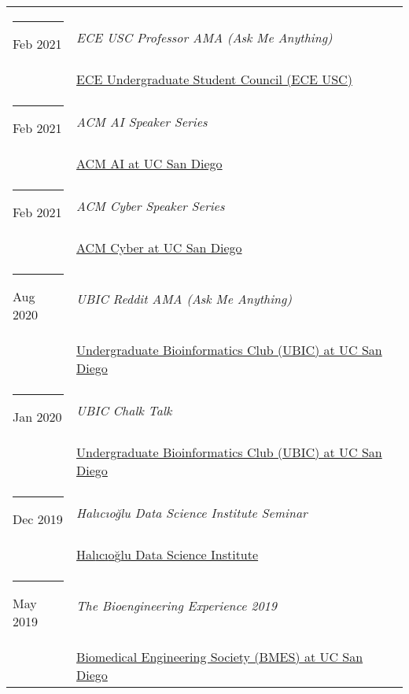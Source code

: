 \documentclass[margin,line]{res}
\begin{document}
\begin{resume}
\begin{longtable}{@{}p{0.7in}p{4in}}
\hspace*{-4mm} \rule{-1mm}{5mm} Feb 2021 & \textit{ECE USC Professor AMA (Ask Me Anything)}\\*
\hspace*{-4mm} & \hspace{4mm} \href{https://eceusc.ucsd.edu/}{ECE Undergraduate Student Council (ECE USC)}\\
\hspace*{-4mm} \rule{-1mm}{5mm} Feb 2021 & \textit{ACM AI Speaker Series}\\*
\hspace*{-4mm} & \hspace{4mm} \href{https://ai.acmucsd.com/}{ACM AI at UC San Diego}\\
\hspace*{-4mm} \rule{-1mm}{5mm} Feb 2021 & \textit{ACM Cyber Speaker Series}\\*
\hspace*{-4mm} & \hspace{4mm} \href{https://www.facebook.com/cyberucsd}{ACM Cyber at UC San Diego}\\
\hspace*{-4mm} \rule{-1mm}{5mm} Aug 2020 & \textit{UBIC Reddit AMA (Ask Me Anything)}\\*
\hspace*{-4mm} & \hspace{4mm} \href{http://ubicucsd.github.io/}{Undergraduate Bioinformatics Club (UBIC) at UC San Diego}\\
\hspace*{-4mm} \rule{-1mm}{5mm} Jan 2020 & \textit{UBIC Chalk Talk}\\*
\hspace*{-4mm} & \hspace{4mm} \href{http://ubicucsd.github.io/}{Undergraduate Bioinformatics Club (UBIC) at UC San Diego}\\
\hspace*{-4mm} \rule{-1mm}{5mm} Dec 2019 & \textit{Hal{\i}c{\i}o{\u g}lu Data Science Institute Seminar}\\*
\hspace*{-4mm} & \hspace{4mm} \href{https://datascience.ucsd.edu/}{Hal{\i}c{\i}o{\u g}lu Data Science Institute}\\
\hspace*{-4mm} \rule{-1mm}{5mm} May 2019 & \textit{The Bioengineering Experience 2019}\\*
\hspace*{-4mm} & \hspace{4mm} \href{http://bmes.ucsd.edu/}{Biomedical Engineering Society (BMES) at UC San Diego}\\

\end{longtable}
\end{resume}
\end{document}
